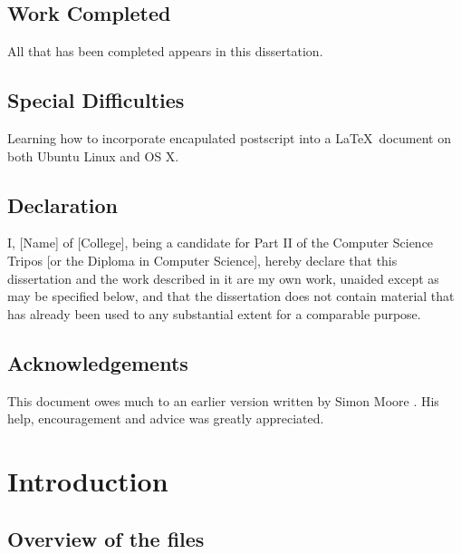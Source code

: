 \documentclass[12pt,a4paper,twoside,openright, hidelinks]{report}
\begin{document}
\section*{Work Completed}

All that has been completed appears in this dissertation.

\section*{Special Difficulties}

Learning how to incorporate encapulated postscript into a \LaTeX\
document on both Ubuntu Linux and OS X.
 
\newpage
\section*{Declaration}

I, [Name] of [College], being a candidate for Part II of the Computer
Science Tripos [or the Diploma in Computer Science], hereby declare
that this dissertation and the work described in it are my own work,
unaided except as may be specified below, and that the dissertation
does not contain material that has already been used to any substantial
extent for a comparable purpose.

\bigskip
{}

\medskip
{}

\tableofcontents

\listoffigures

\newpage
\section*{Acknowledgements}

This document owes much to an earlier version written by Simon Moore
\cite{Moore95}.  His help, encouragement and advice was greatly 
appreciated.


\pagestyle{headings}

\chapter{Introduction}

\section{Overview of the files}
\end{document}
